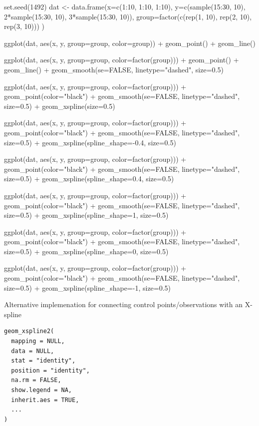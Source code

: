 \documentclass[a4paper]{book}
\begin{document}
\begin{Examples}
\begin{ExampleCode}
set.seed(1492)
dat <- data.frame(x=c(1:10, 1:10, 1:10),
                  y=c(sample(15:30, 10), 2*sample(15:30, 10),
                      3*sample(15:30, 10)),
                  group=factor(c(rep(1, 10), rep(2, 10), rep(3, 10)))
)

ggplot(dat, aes(x, y, group=group, color=group)) +
  geom_point() +
  geom_line()

ggplot(dat, aes(x, y, group=group, color=factor(group))) +
  geom_point() +
  geom_line() +
  geom_smooth(se=FALSE, linetype="dashed", size=0.5)

ggplot(dat, aes(x, y, group=group, color=factor(group))) +
  geom_point(color="black") +
  geom_smooth(se=FALSE, linetype="dashed", size=0.5) +
  geom_xspline(size=0.5)

ggplot(dat, aes(x, y, group=group, color=factor(group))) +
  geom_point(color="black") +
  geom_smooth(se=FALSE, linetype="dashed", size=0.5) +
  geom_xspline(spline_shape=-0.4, size=0.5)

ggplot(dat, aes(x, y, group=group, color=factor(group))) +
  geom_point(color="black") +
  geom_smooth(se=FALSE, linetype="dashed", size=0.5) +
  geom_xspline(spline_shape=0.4, size=0.5)

ggplot(dat, aes(x, y, group=group, color=factor(group))) +
  geom_point(color="black") +
  geom_smooth(se=FALSE, linetype="dashed", size=0.5) +
  geom_xspline(spline_shape=1, size=0.5)

ggplot(dat, aes(x, y, group=group, color=factor(group))) +
  geom_point(color="black") +
  geom_smooth(se=FALSE, linetype="dashed", size=0.5) +
  geom_xspline(spline_shape=0, size=0.5)

ggplot(dat, aes(x, y, group=group, color=factor(group))) +
  geom_point(color="black") +
  geom_smooth(se=FALSE, linetype="dashed", size=0.5) +
  geom_xspline(spline_shape=-1, size=0.5)
\end{ExampleCode}
\end{Examples}
%
\begin{Description}
Alternative implemenation for connecting  control points/observations
with an X-spline
\end{Description}
%
\begin{Usage}
\begin{verbatim}
geom_xspline2(
  mapping = NULL,
  data = NULL,
  stat = "identity",
  position = "identity",
  na.rm = FALSE,
  show.legend = NA,
  inherit.aes = TRUE,
  ...
)
\end{verbatim}
\end{Usage}
\end{document}
